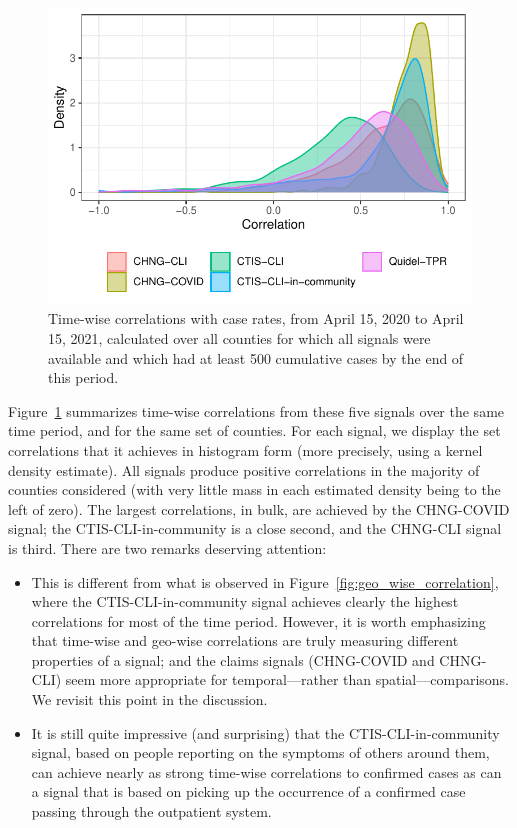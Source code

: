 \documentclass[9pt,twocolumn,twoside,lineno]{pnas-new}
\begin{document}
\begin{figure}[t]
  \includegraphics[width=\columnwidth]{fig/time_wise_correlation.pdf}
  \caption{Time-wise correlations with case rates, from April 15, 2020 to April
    15, 2021, calculated over all counties for which all signals were available
    and which had at least 500 cumulative cases by the end of this period.}
  \label{fig:time_wise_correlation}
 \end{figure}

Figure~\ref{fig:time_wise_correlation} summarizes time-wise correlations from 
these five signals over the same time period, and for the same set of
counties. For each signal, we display the set correlations that it achieves in
histogram form (more precisely, using a kernel density estimate). All signals
produce positive correlations in the majority of counties considered (with very
little mass in each estimated density being to the left of zero). The largest
correlations, in bulk, are achieved by the CHNG-COVID signal; the
CTIS-CLI-in-community is a close second, and the CHNG-CLI signal is third.
There are two remarks deserving attention:

\begin{itemize}
\item This is different from what is observed in
  Figure~\ref{fig:geo_wise_correlation}, where the CTIS-CLI-in-community signal
  achieves clearly the highest correlations for most of the time
  period. However, it is worth emphasizing that time-wise and geo-wise
  correlations are truly measuring different properties of a signal; and the
  claims signals (CHNG-COVID and CHNG-CLI) seem more appropriate for
  temporal---rather than spatial---comparisons.  We revisit this point in the
  discussion.
\item It is still quite impressive (and surprising) that the
  CTIS-CLI-in-community signal, based on people reporting on the symptoms of
  others around them, can achieve  nearly as strong time-wise correlations to
  confirmed cases as can a signal that is based on picking up the occurrence of
  a confirmed case passing through the outpatient system.
\end{itemize}
\end{document}
